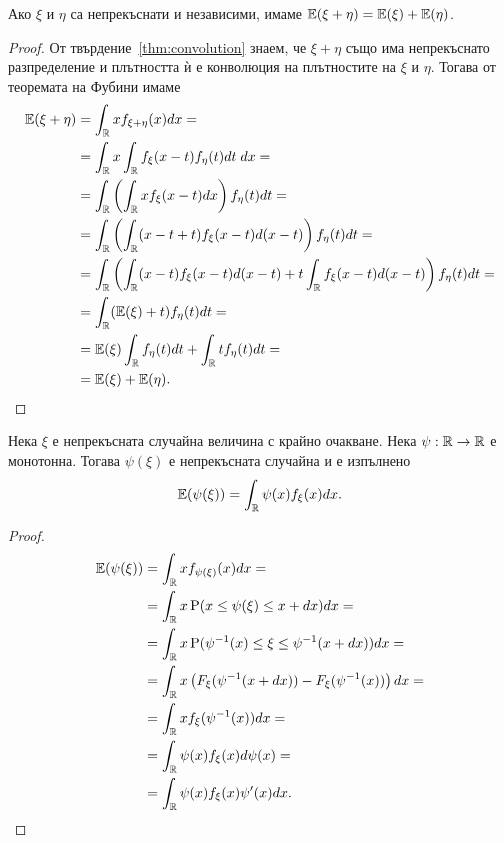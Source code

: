 \documentclass[numbers=endperiod, bibliography=totocnumbered]{scrartcl}
\begin{document}
\begin{proposition}\label{thm:expect-additive}
  Ако \( \xi \) и \( \eta \) са непрекъснати и независими, имаме \( \mathbb{E}(\xi + \eta) = \mathbb{E}(\xi) + \mathbb{E}(\eta) \).
\end{proposition}
\begin{proof}
  От твърдение~\ref{thm:convolution} знаем, че \( \xi + \eta \) също има непрекъснато разпределение и плътността ѝ е конволюция на плътностите на \( \xi \) и \( \eta \). Тогава от теоремата на Фубини имаме
  \begin{align*}
    \mathbb{E}(\xi + \eta)
    &=
    \int_{\mathbb{R}} x f_{\xi + \eta} (x) dx
    = \\ &=
    \int_{\mathbb{R}} x \int_{\mathbb{R}} f_\xi(x - t) f_\eta(t) dt \; dx
    = \\ &=
    \int_{\mathbb{R}} \left( \int_{\mathbb{R}} x f_\xi(x - t) dx \right) f_\eta(t) dt
    = \\ &=
    \int_{\mathbb{R}} \left( \int_{\mathbb{R}} (x - t + t) f_\xi(x - t) d(x - t) \right) f_\eta(t) dt
    = \\ &=
    \int_{\mathbb{R}} \left( \int_{\mathbb{R}} (x - t) f_\xi(x - t) d(x - t) + t \int_{\mathbb{R}} f_\xi(x - t) d(x - t) \right) f_\eta(t) dt
    = \\ &=
    \int_{\mathbb{R}} (\mathbb{E}(\xi) + t) f_\eta(t) dt
    = \\ &=
    \mathbb{E}(\xi) \int_{\mathbb{R}} f_\eta(t) dt + \int_{\mathbb{R}} t f_\eta(t) dt
    = \\ &=
    \mathbb{E}(\xi) + \mathbb{E}(\eta).
  \end{align*}
\end{proof}

\begin{proposition}\label{thm:lotus}
  Нека \( \xi \) е непрекъсната случайна величина с крайно очакване. Нека \( \psi: \mathbb{R} \to \mathbb{R} \) е монотонна. Тогава \( \psi(\xi) \) е непрекъсната случайна и е изпълнено
  \begin{align*}
    \mathbb{E}(\psi(\xi))
    =
    \int_{\mathbb{R}} \psi(x) f_\xi(x) dx.
  \end{align*}
\end{proposition}

\begin{proof}
  \begin{align*}
    \mathbb{E}(\psi(\xi))
    &=
    \int_{\mathbb{R}} x f_{\psi(\xi)}(x) dx
    = \\ &=
    \int_{\mathbb{R}} x \operatorname{P}(x \leq \psi(\xi) \leq x + dx) dx
    = \\ &=
    \int_{\mathbb{R}} x \operatorname{P}(\psi^{-1}(x) \leq \xi \leq \psi^{-1}(x + dx)) dx
    = \\ &=
    \int_{\mathbb{R}} x \left( F_\xi(\psi^{-1}(x + dx)) - F_\xi(\psi^{-1}(x)) \right) dx
    = \\ &=
    \int_{\mathbb{R}} x f_\xi(\psi^{-1}(x)) dx
    = \\ &=
    \int_{\mathbb{R}} \psi(x) f_\xi(x) d \psi(x)
    = \\ &=
    \int_{\mathbb{R}} \psi(x) f_\xi(x) \psi'(x) dx.
  \end{align*}
\end{proof}
\end{document}
